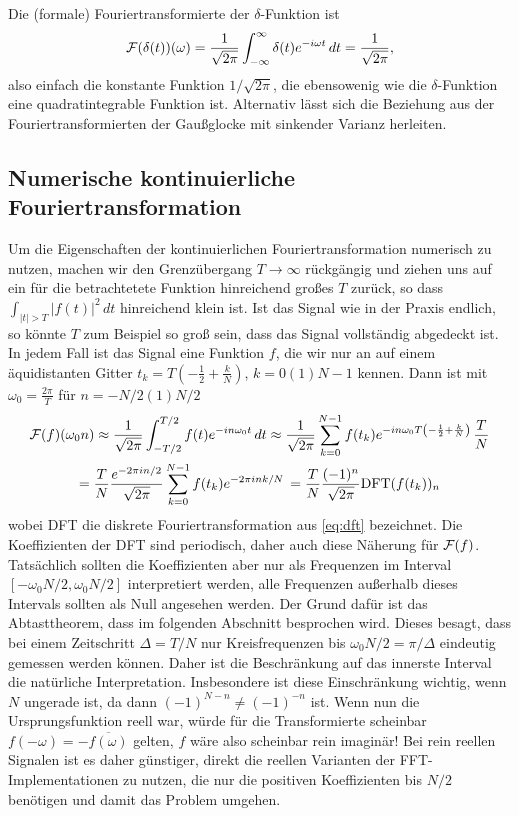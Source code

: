 Die (formale) Fouriertransformierte der $\delta$-Funktion ist
\begin{equation}
  \label{eq:fourierdelta}
  \mathcal F(\delta(t))(\omega)
  =
  \frac{1}{\sqrt{2\pi}}\int_{-\infty}^{\infty}
  \delta(t)e^{-i \omega t}\, dt = \frac{1}{\sqrt{2\pi}},
\end{equation}
also einfach die konstante Funktion $1/\sqrt{2\pi}$, die ebensowenig
wie die $\delta$-Funktion eine quadratintegrable Funktion
ist. Alternativ lässt sich die Beziehung aus der
Fouriertransformierten der Gaußglocke mit sinkender Varianz herleiten.

\subsection{Numerische kontinuierliche Fouriertransformation}
\label{sec:contdft}

Um die Eigenschaften der kontinuierlichen Fouriertransformation
numerisch zu nutzen, machen wir den Grenzübergang $T\to\infty$
rückgängig und ziehen uns auf ein für die betrachtetete Funktion
hinreichend großes $T$ zurück, so dass $\int_{\lvert t\rvert>T}\lvert
f(t)\rvert^2\, dt$ hinreichend klein ist. Ist das Signal wie in der
Praxis endlich, so könnte $T$ zum Beispiel so groß sein, dass das
Signal vollständig abgedeckt ist. In jedem Fall ist das Signal eine
Funktion $f$, die wir nur an auf einem äquidistanten Gitter $t_k =
T\left(-\frac{1}{2} + \frac{k}{N}\right)$, $k=0(1)N-1$ kennen. Dann
ist mit $\omega_0=\frac{2\pi}{T}$ für $n=-N/2(1)N/2$
\begin{multline}
  \label{eq:dftcont}
  \mathcal F(f)(\omega_0 n)\approx
  \frac{1}{\sqrt{2\pi}}\int_{-T/2}^{T/2} f(t)e^{-i n \omega_0 t}\, dt
  \approx
  \frac{1}{\sqrt{2\pi}}\sum_{k=0}^{N-1}
  f(t_k)
  e^{-i n\omega_0 T\left(-\frac{1}{2} + \frac{k}{N}\right)}\,
  \frac{T}{N}\\
  =   \frac{T}{N} \frac{e^{-2\pi i n /2}}{\sqrt{2\pi}}\sum_{k=0}^{N-1}
  f(t_k) e^{-2\pi i n k / N}\,
  =\frac{T}{N}\frac{(-1)^n}{\sqrt{2\pi}} \text{DFT}(f(t_k))_n
\end{multline}
wobei DFT die diskrete Fouriertransformation aus \eqref{eq:dft}
bezeichnet.  Die Koeffizienten der DFT sind periodisch, daher auch
diese Näherung für $\mathcal F(f)$. Tatsächlich sollten die Koeffizienten
aber nur als Frequenzen im Interval $[-\omega_0 N/2,\omega_0 N/2]$
interpretiert werden, alle Frequenzen außerhalb dieses Intervals
sollten als Null angesehen werden. Der Grund dafür ist das
Abtasttheorem, dass im folgenden Abschnitt besprochen wird. Dieses
besagt, dass bei einem Zeitschritt $\Delta=T/N$ nur Kreisfrequenzen
bis $\omega_0 N/2 = \pi/\Delta$ eindeutig gemessen werden
können. Daher ist die Beschränkung auf das innerste Interval die
natürliche Interpretation. Insbesondere ist diese Einschränkung
wichtig, wenn $N$ ungerade ist, da dann $(-1)^{N-n}\neq (-1)^{-n}$
ist. Wenn nun die Ursprungsfunktion reell war, würde für die
Transformierte scheinbar $f(-\omega)=-\overline{f(\omega)}$ gelten,
$f$ wäre also scheinbar rein imaginär! Bei rein reellen Signalen ist
es daher günstiger, direkt die reellen Varianten der
FFT-Implementationen zu nutzen, die nur die positiven Koeffizienten
bis $N/2$ benötigen und damit das Problem umgehen.

